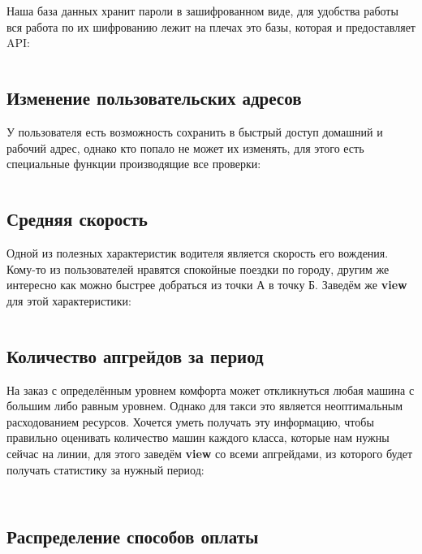 \documentclass[fontsize=12pt]{article}
\begin{document}
Наша база данных хранит пароли в зашифрованном виде, для удобства работы вся работа по их шифрованию лежит на плечах это базы, которая и предоставляет API:

\inputminted[frame=single]{sql}{scripts/functions/add-user.sql}

\subsection*{Изменение пользовательских адресов}

У пользователя есть возможность сохранить в быстрый доступ домашний и рабочий адрес, однако кто попало не может их изменять, для этого есть специальные функции производящие все проверки:

\inputminted[frame=single]{sql}{scripts/functions/modify-user-address.sql}

\subsection*{Средняя скорость}

Одной из полезных характеристик водителя является скорость его вождения. Кому-то из пользователей нравятся спокойные поездки по городу, другим же интересно как можно быстрее добраться из точки А в точку Б. Заведём же \textbf{view} для этой характеристики:

\inputminted[frame=single]{sql}{scripts/views/average-speed.sql}

\subsection*{Количество апгрейдов за период}

На заказ с определённым уровнем комфорта может откликнуться любая машина с большим либо равным уровнем. Однако для такси это является неоптимальным расходованием ресурсов. Хочется уметь получать эту информацию, чтобы правильно оценивать количество машин каждого класса, которые нам нужны сейчас на линии, для этого заведём \textbf{view} со всеми апгрейдами, из которого будет получать статистику за нужный период:

\inputminted[frame=single]{sql}{scripts/views/upgrades.sql}

\inputminted[frame=single]{sql}{scripts/functions/upgrades-in-period.sql}

\subsection*{Распределение способов оплаты}
\end{document}
